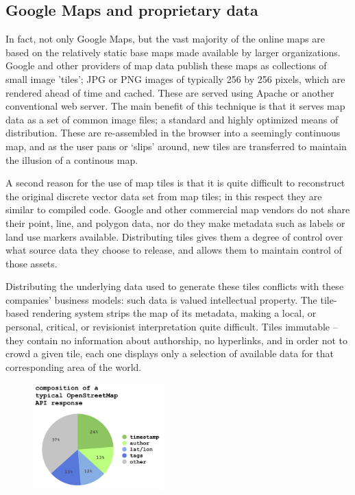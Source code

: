 \documentclass[11pt,oneside,notitlepage]{report}
\begin{document}
\subsection{Google Maps and proprietary data}

In fact, not only Google Maps, but the vast majority of the online maps are based on the relatively static base maps made available by larger organizations. Google and other providers of map data publish these maps as collections of small image 'tiles'; JPG or PNG images of typically 256 by 256 pixels, which are rendered ahead of time and cached. These are served using Apache or another conventional web server. The main benefit of this technique is that it serves map data as a set of common image files; a standard and highly optimized means of distribution. These are re-assembled in the browser into a seemingly continuous map, and as the user pans or `slips' around, new tiles are transferred to maintain the illusion of a continous map.

A second reason for the use of map tiles is that it is quite difficult to reconstruct the original discrete vector data set from map tiles; in this respect they are similar to compiled code. Google and other commercial map vendors do not share their point, line, and polygon data, nor do they make metadata such as labels or land use markers available. Distributing tiles gives them a degree of control over what source data they choose to release, and allows them to maintain control of those assets.

Distributing the underlying data used to generate these tiles conflicts with these companies' business models: such data is valued intellectual property. The tile-based rendering system strips the map of its metadata, making a local, or personal, critical, or revisionist interpretation quite difficult. Tiles immutable – they contain no information about authorship, no hyperlinks, and in order not to crowd a given tile, each one displays only a selection of available data for that corresponding area of the world. 

\begin{figure}
	\begin{flushleft}
		\includegraphics[width=0.45\textwidth]{images/osm-composition.png}
	\end{flushleft}
\end{figure}
\end{document}
